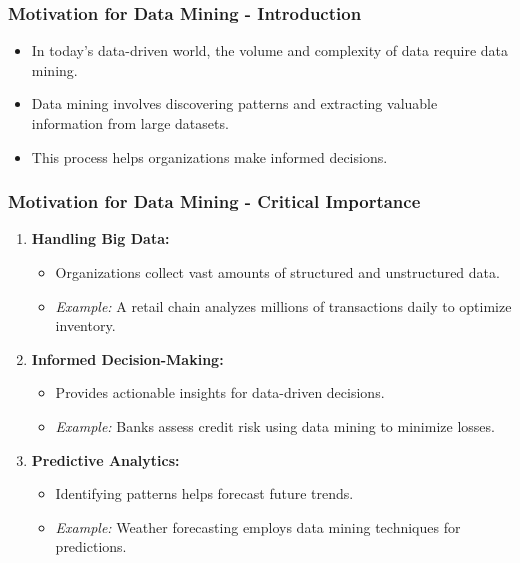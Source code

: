 \documentclass[aspectratio=169]{beamer}
\begin{document}
\begin{frame}[fragile]
    \frametitle{Motivation for Data Mining - Introduction}
    \begin{itemize}
        \item In today's data-driven world, the volume and complexity of data require data mining.
        \item Data mining involves discovering patterns and extracting valuable information from large datasets.
        \item This process helps organizations make informed decisions.
    \end{itemize}
\end{frame}

\begin{frame}[fragile]
    \frametitle{Motivation for Data Mining - Critical Importance}
    \begin{enumerate}
        \item \textbf{Handling Big Data:}
            \begin{itemize}
                \item Organizations collect vast amounts of structured and unstructured data.
                \item \textit{Example:} A retail chain analyzes millions of transactions daily to optimize inventory.
            \end{itemize}
        \item \textbf{Informed Decision-Making:}
            \begin{itemize}
                \item Provides actionable insights for data-driven decisions.
                \item \textit{Example:} Banks assess credit risk using data mining to minimize losses.
            \end{itemize}
        \item \textbf{Predictive Analytics:}
            \begin{itemize}
                \item Identifying patterns helps forecast future trends.
                \item \textit{Example:} Weather forecasting employs data mining techniques for predictions.
            \end{itemize}
    \end{enumerate}
\end{frame}
\end{document}
